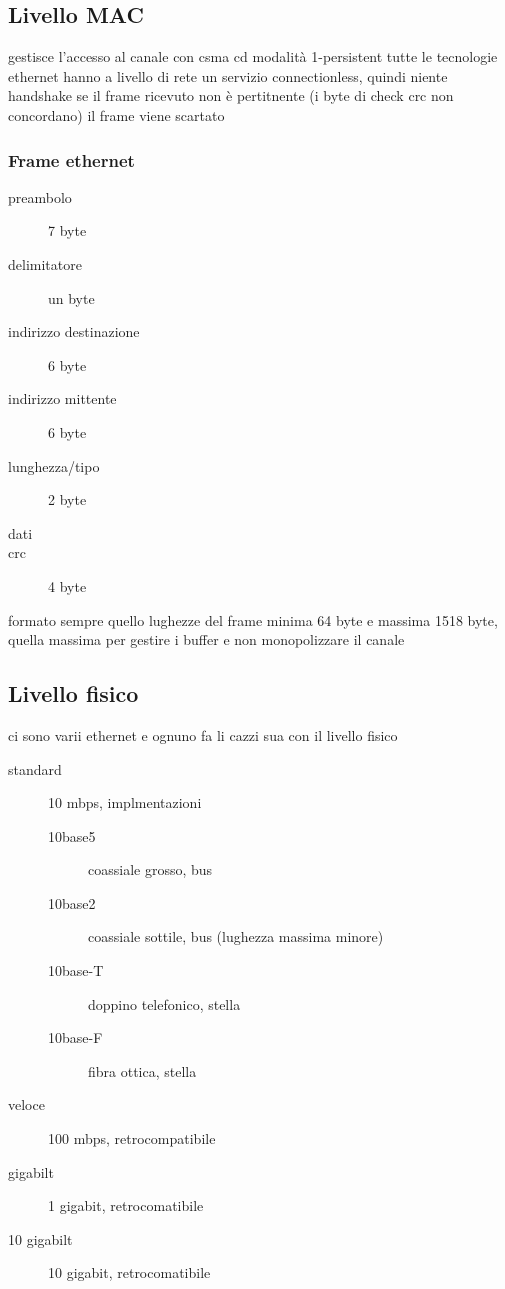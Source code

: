 \documentclass[11pt]{article}
\begin{document}
\subsection{Livello MAC}
\label{sec:orga338127}
gestisce l'accesso al canale con csma cd modalità 1-persistent
tutte le tecnologie ethernet hanno a livello di rete un servizio connectionless, quindi niente handshake
se il frame ricevuto non è pertitnente (i byte di check crc non concordano) il frame viene scartato

\subsubsection{Frame ethernet}
\label{sec:org1f87f70}
\begin{description}
\item[{preambolo}] 7 byte
\item[{delimitatore}] un byte
\item[{indirizzo destinazione}] 6 byte
\item[{indirizzo mittente}] 6 byte
\item[{lunghezza/tipo}] 2 byte
\item[{dati}] 

\item[{crc}] 4 byte
\end{description}

formato sempre quello
lughezze del frame minima 64 byte e massima 1518 byte, quella massima per gestire i buffer e non monopolizzare il canale

\subsection{Livello fisico}
\label{sec:org93a9753}
ci sono varii ethernet e ognuno fa li cazzi sua con il livello fisico
\begin{description}
\item[{standard}] 10 mbps, implmentazioni
\begin{description}
\item[{10base5}] coassiale grosso, bus
\item[{10base2}] coassiale sottile, bus (lughezza massima minore)
\item[{10base-T}] doppino telefonico, stella
\item[{10base-F}] fibra ottica, stella
\end{description}
\item[{veloce}] 100 mbps, retrocompatibile
\item[{gigabilt}] 1 gigabit, retrocomatibile
\item[{10 gigabilt}] 10 gigabit, retrocomatibile
\end{description}
\end{document}
